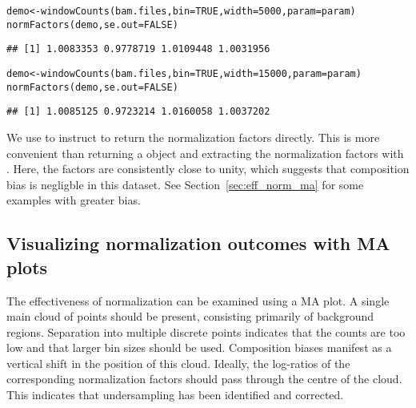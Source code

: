 \documentclass{report}\usepackage[]{graphicx}\usepackage[usenames,dvipsnames]{color}
\newcommand{\hlnum}[1]{\textcolor[rgb]{0.816,0.125,0.439}{#1}}%
\newcommand{\hlstd}[1]{\textcolor[rgb]{0.251,0.251,0.251}{#1}}%
\newcommand{\hlkwb}[1]{\textcolor[rgb]{0,0,0}{#1}}%
\newcommand{\hlkwc}[1]{\textcolor[rgb]{0.251,0.251,0.251}{#1}}%
\newcommand{\hlkwd}[1]{\textcolor[rgb]{0.878,0.439,0.125}{#1}}%
\newenvironment{knitrout}{}{} %
\begin{document}
\begin{knitrout}
\color{fgcolor}\begin{kframe}
\begin{alltt}
\hlstd{demo} \hlkwb{<-} \hlkwd{windowCounts}\hlstd{(bam.files,} \hlkwc{bin}\hlstd{=}\hlnum{TRUE}\hlstd{,} \hlkwc{width}\hlstd{=}\hlnum{5000}\hlstd{,} \hlkwc{param}\hlstd{=param)}
\hlkwd{normFactors}\hlstd{(demo,} \hlkwc{se.out}\hlstd{=}\hlnum{FALSE}\hlstd{)}
\end{alltt}
\begin{verbatim}
## [1] 1.0083353 0.9778719 1.0109448 1.0031956
\end{verbatim}
\begin{alltt}
\hlstd{demo} \hlkwb{<-} \hlkwd{windowCounts}\hlstd{(bam.files,} \hlkwc{bin}\hlstd{=}\hlnum{TRUE}\hlstd{,} \hlkwc{width}\hlstd{=}\hlnum{15000}\hlstd{,} \hlkwc{param}\hlstd{=param)}
\hlkwd{normFactors}\hlstd{(demo,} \hlkwc{se.out}\hlstd{=}\hlnum{FALSE}\hlstd{)}
\end{alltt}
\begin{verbatim}
## [1] 1.0085125 0.9723214 1.0160058 1.0037202
\end{verbatim}
\end{kframe}
\end{knitrout}

We use  to instruct  to return the normalization factors directly.
This is more convenient than returning a  object and extracting the normalization factors with .
Here, the factors are consistently close to unity, which suggests that composition bias is negligble in this dataset.
See Section~\ref{sec:eff_norm_ma} for some examples with greater bias.

\subsection{Visualizing normalization outcomes with MA plots}
The effectiveness of normalization can be examined using a MA plot. 
A single main cloud of points should be present, consisting primarily of background regions.
Separation into multiple discrete points indicates that the counts are too low and that larger bin sizes should be used. 
Composition biases manifest as a vertical shift in the position of this cloud. 
Ideally, the log-ratios of the corresponding normalization factors should pass through the centre of the cloud. 
This indicates that undersampling has been identified and corrected.
\end{document}
